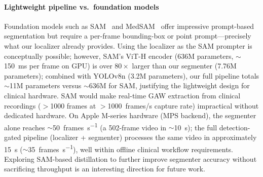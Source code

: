 \documentclass[preprint,12pt]{elsarticle}
\newcommand{\gaw}{GAW}
\begin{document}
\paragraph{Lightweight pipeline vs.\ foundation models}
Foundation models such as SAM~\cite{kirillov2023sam} and
MedSAM~\cite{ma2024medsam} offer impressive prompt-based segmentation but
require a per-frame bounding-box or point prompt---precisely what our
localizer already provides.
Using the localizer as the SAM prompter is conceptually possible; however, SAM's
ViT-H encoder (\num{636}M parameters, ${\sim}$\SI{150}{ms} per frame on
GPU) is over $80\times$ larger than our segmenter (\num{7.76}M parameters);
combined with YOLOv8n (\num{3.2}M parameters), our full pipeline totals
${\sim}$\num{11}M parameters versus ${\sim}$\num{636}M for SAM, justifying
the lightweight design for clinical hardware.
SAM would make real-time \gaw{} extraction from clinical recordings
($>$\num{1000} frames at $>$\SI{1000}{frames/s} capture rate) impractical
without dedicated hardware.
On Apple M-series hardware (MPS backend), the segmenter alone reaches
${\sim}$\SI{50}{frames\per\second} (a \num{502}-frame video in
${\sim}$\SI{10}{s}); the full detection-gated pipeline (localizer + segmenter)
processes the same video in approximately \SI{15}{s}
(${\sim}$\SI{35}{frames\per\second}), well within offline clinical workflow
requirements.
Exploring SAM-based distillation to further improve segmenter accuracy without
sacrificing throughput is an interesting direction for future work.
\end{document}
